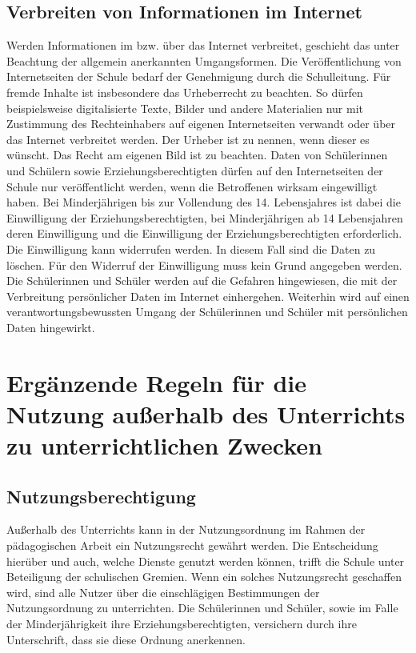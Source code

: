 \documentclass[a4paper, parskip]{scrartcl}
\begin{document}
\subsection{Verbreiten von Informationen im Internet}
Werden Informationen im bzw. über das Internet verbreitet, geschieht das unter
Beachtung der allgemein anerkannten Umgangsformen. Die Veröffentlichung von
Internetseiten der Schule bedarf der Genehmigung durch die Schulleitung. Für
fremde Inhalte ist insbesondere das Urheberrecht zu beachten. So dürfen
beispielsweise digitalisierte Texte, Bilder und andere Materialien nur mit
Zustimmung des Rechteinhabers auf eigenen Internetseiten verwandt oder über das
Internet verbreitet werden. Der Urheber ist zu nennen, wenn dieser es wünscht.
Das Recht am eigenen Bild ist zu beachten. Daten von Schülerinnen und Schülern
sowie Erziehungsberechtigten dürfen auf den Internetseiten der Schule nur
veröffentlicht werden, wenn die Betroffenen wirksam eingewilligt haben. Bei
Minderjährigen bis zur Vollendung des 14. Lebensjahres ist dabei die
Einwilligung der Erziehungsberechtigten, bei Minderjährigen ab 14 Lebensjahren
deren Einwilligung und die Einwilligung der Erziehungsberechtigten
erforderlich. Die Einwilligung kann widerrufen werden. In diesem Fall sind die
Daten zu löschen. Für den Widerruf der Einwilligung muss kein Grund angegeben
werden. Die Schülerinnen und Schüler werden auf die Gefahren hingewiesen, die
mit der Verbreitung persönlicher Daten im Internet einhergehen. Weiterhin wird
auf einen verantwortungsbewussten Umgang der Schülerinnen und Schüler mit
persönlichen Daten hingewirkt.

\section{Ergänzende Regeln für die Nutzung außerhalb des Unterrichts zu
unterrichtlichen Zwecken}
\subsection{Nutzungsberechtigung}
Außerhalb des Unterrichts kann in der Nutzungsordnung im Rahmen der
pädagogischen Arbeit ein Nutzungsrecht gewährt werden. Die Entscheidung
hierüber und auch, welche Dienste genutzt werden können, trifft die Schule
unter Beteiligung der schulischen Gremien. Wenn ein solches Nutzungsrecht
geschaffen wird, sind alle Nutzer über die einschlägigen Bestimmungen der
Nutzungsordnung zu unterrichten. Die Schülerinnen und Schüler, sowie im Falle
der Minderjährigkeit ihre Erziehungsberechtigten, versichern durch ihre
Unterschrift, dass sie diese Ordnung anerkennen.
\end{document}
